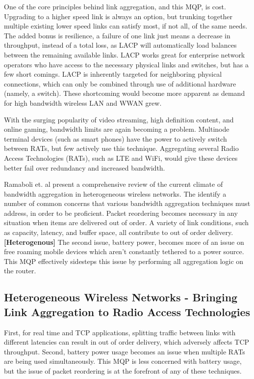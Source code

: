 \documentclass[12pt]{article}
\newcommand{\lcite}[1]
{{\bfseries\color{orange}[#1]}}
\begin{document}
	One of the core principles behind link aggregation, and this MQP, is cost. Upgrading to a higher speed link is always an option, but trunking together multiple existing lower speed links can satisfy most, if not all, of the same needs. The added bonus is resilience, a failure of one link just means a decrease in throughput, instead of a total loss, as LACP will automatically load balances between the remaining available links. LACP works great for enterprise network operators who have access to the necessary physical links and switches, but has a few short comings. LACP is inherently targeted for neighboring physical connections, which can only be combined through use of additional hardware (namely, a switch). These shortcoming would become more apparent as demand for high bandwidth wireless LAN and WWAN grew.

	With the surging popularity of video streaming, high definition content, and online gaming, bandwidth limits are again becoming a problem. Multinode terminal devices (such as smart phones) have the power to actively switch between RATs, but few actively use this technique. Aggregating several Radio Access Technologies (RATs), such as LTE and WiFi, would give these devices better fail over redundancy and increased bandwidth. 

	Ramaboli et. al present a comprehensive review of the current climate of bandwidth aggregation in heterogeneous wireless networks. The identify a number of common concerns that various bandwidth aggregation techniques must address, in order to be proficient. Packet reordering becomes necessary in any situation when items are delivered out of order. A variety of link conditions, such as capacity, latency, and buffer space, all contribute to out of order delivery.\lcite{Heterogenous} The second issue, battery power, becomes more of an issue on free roaming mobile devices which aren't constantly tethered to a power source. This MQP effectively sidesteps this issue by performing all aggregation logic on the router.


	\subsection{Heterogeneous Wireless Networks - Bringing Link Aggregation to Radio Access Technologies}

		 First, for real time and TCP applications, splitting traffic between links with different latencies can result in out of order delivery, which adversely affects TCP throughput. Second, battery power usage becomes an issue when multiple RATs are being used simultaneously. This MQP is less concerned with battery usage, but the issue of packet reordering is at the forefront of any of these techniques. \\
\end{document}
